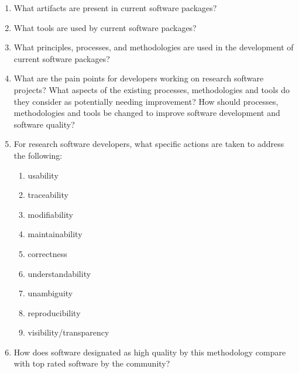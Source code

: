 \documentclass[letterpaper,cleveref]{lipics-v2019}
\theoremstyle{definition}
\begin{document}
\begin{enumerate}
\item What artifacts are present in current software packages? 
\item What tools are used by current software packages?
\item What principles, processes, and methodologies are used in the development
  of current software packages?
\item What are the pain points for developers working on research software
  projects?  What aspects of the existing processes, methodologies and tools do
  they consider as potentially needing improvement?  How should processes,
  methodologies and tools be changed to improve software development and
  software quality?
\item For research software developers, what specific actions are taken to
  address the following:
\begin{enumerate}
\item usability
\item traceability
\item modifiability
\item maintainability
\item correctness
\item understandability
\item unambiguity
\item reproducibility
\item visibility/transparency
\end{enumerate} 
\item How does software designated as high quality by this methodology compare
  with top rated software by the community?
\end{enumerate}
\end{document}

